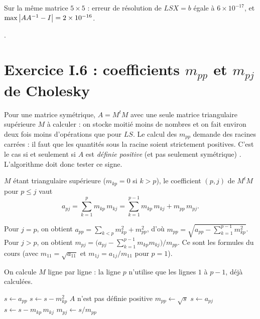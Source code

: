 \Verif Sur la même matrice $5\times 5$ : erreur de résolution de $LSX = b$
égale à $6\times 10^{-17}$, et $\max\left|AA^{-1} - I\right| = 2\times 10^{-16}$.

\Refs {}.

\section{\texorpdfstring{Exercice I.6 : coefficients $m_{pp}$ et $m_{pj}$ de Cholesky}{Exercice I.6 : coefficients mpp et mpj de Cholesky}}


\Pourquoi Pour une matrice symétrique, $A = M^{t}M$ avec une seule matrice
triangulaire supérieure $M$ à calculer : on stocke moitié moins de nombres et
on fait environ deux fois moins d'opérations que pour $LS$. Le calcul des
$m_{pp}$ demande des racines carrées : il faut que les quantités sous la racine
soient strictement positives. C'est le cas si et seulement si $A$ est
\emph{définie positive} (et pas seulement symétrique) . L'algorithme doit donc tester ce signe.

\Etapes
{} $M$ étant triangulaire supérieure ($m_{kp} = 0$ si $k > p$), le
coefficient $(p, j)$ de $M^{t}M$ pour $p \le j$ vaut
\[
  a_{pj} = \sum_{k=1}^{p} m_{kp}\,m_{kj}
         = \sum_{k=1}^{p-1} m_{kp}\,m_{kj} + m_{pp}\,m_{pj} .
\]

 Pour $j = p$, on obtient
$a_{pp} = \sum_{k<p} m_{kp}^2 + m_{pp}^2$, d'où
$m_{pp} = \sqrt{a_{pp} - \sum_{k=1}^{p-1} m_{kp}^2}$. Pour $j > p$, on obtient
$m_{pj} = \bigl(a_{pj} - \sum_{k=1}^{p-1} m_{kp}m_{kj}\bigr)/m_{pp}$. Ce sont
les formules du cours (avec $m_{11} = \sqrt{a_{11}}$ et
$m_{1j} = a_{1j}/m_{11}$ pour $p = 1$).

 On calcule $M$ ligne par ligne : la ligne $p$ n'utilise que les lignes
$1$ à $p-1$, déjà calculées.

\begin{algo}[ : Cholesky $A = M^{t}M$]
    \State $s \leftarrow a_{pp}$
     \State $s \leftarrow s - m_{kp}^2$ \EndFor
     \Print \og $A$ n'est pas définie positive \fg{} \Stop \EndIf
    \State $m_{pp} \leftarrow \sqrt{s}$
      \State $s \leftarrow a_{pj}$
       \State $s \leftarrow s - m_{kp}\,m_{kj}$ \EndFor
      \State $m_{pj} \leftarrow s/m_{pp}$
    \EndFor
  \EndFor
\end{algo}

